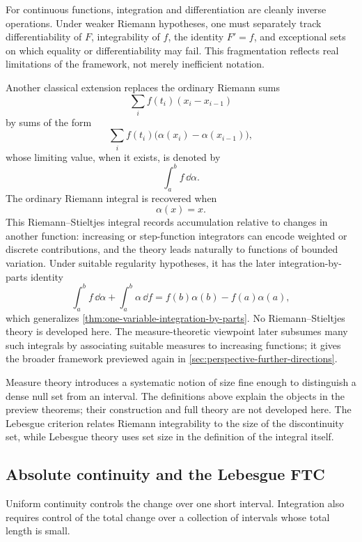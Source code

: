 For continuous functions, integration and differentiation are cleanly
inverse operations. Under weaker Riemann hypotheses, one must separately
track differentiability of \(F\), integrability of \(f\), the identity
\(F'=f\), and exceptional sets on which equality or differentiability may
fail. This fragmentation reflects real limitations of the framework, not
merely inefficient notation.

\begin{remark}
Another classical extension replaces the ordinary Riemann sums
\[
\sum_i f(t_i)(x_i-x_{i-1})
\]
by sums of the form
\[
\sum_i f(t_i)\bigl(\alpha(x_i)-\alpha(x_{i-1})\bigr),
\]
whose limiting value, when it exists, is denoted by
\[
\int_a^b f\,\dd\alpha.
\]
The ordinary Riemann integral is recovered when
\[
\alpha(x)=x.
\]
This Riemann--Stieltjes integral records accumulation relative to changes in
another function: increasing or step-function integrators can encode weighted
or discrete contributions, and the theory leads naturally to functions of
bounded variation.  Under suitable regularity hypotheses, it has the later
integration-by-parts identity
\[
\int_a^b f\,\dd\alpha
+
\int_a^b \alpha\,\dd f
=
f(b)\alpha(b)-f(a)\alpha(a),
\]
which generalizes \cref{thm:one-variable-integration-by-parts}.  No
Riemann--Stieltjes theory is developed here.  The measure-theoretic viewpoint
later subsumes many such integrals by associating suitable measures to
increasing functions; it gives the broader framework previewed again in
\cref{sec:perspective-further-directions}.
\end{remark}

Measure theory introduces a systematic notion of size fine enough to
distinguish a dense null set from an interval. The definitions above explain
the objects in the preview theorems; their construction and full theory are
not developed here. The Lebesgue criterion relates Riemann integrability to
the size of the discontinuity set, while Lebesgue theory uses set size in
the definition of the integral itself.



\subsection{Absolute continuity and the Lebesgue FTC}
\label{sec:absolute-continuity-ftc}

Uniform continuity controls the change over one short interval.
Integration also requires control of the total change over a collection
of intervals whose total length is small.

